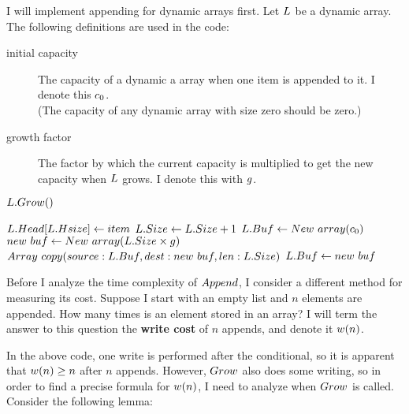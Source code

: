 \HdrDynArrayImpl

I will implement appending for dynamic arrays first. Let $L$ be a dynamic array. The following definitions are used in the code:

\begin{description}
	\item[initial capacity] The capacity of a dynamic a array when one item is appended to it. I denote this $c_0$.\\
	(The capacity of any dynamic array with size zero should be zero.)
	\item[growth factor] The factor by which the current capacity is multiplied to get the new capacity when $L$ grows. I denote this with $g$.
\end{description}

\begin{algorithm}
	\begin{algorithmic}[1]
				\State $L.Grow()$
			\EndIf
			
			\State $L.Head[L.Hsize] \gets item$
			\State $L.Size \gets L.Size + 1$
		\EndProcedure
		\Statex
				\State $L.Buf \gets New\ array(c_0)$
			\Else
				\State $new\ buf \gets \FuncNewArray(\VarList.\FieldSize \times \VarGrowthFactor)$
				\State $Array\ copy(source: L.Buf, dest: new\ buf, len: L.Size)$
				\State $L.Buf \gets new\ buf$
			\EndIf
		\EndProcedure
	\end{algorithmic}
\end{algorithm}

\HdrTimeComplex

Before I analyze the time complexity of $Append$, I consider a different method for measuring its cost. Suppose I start with an empty list and $n$ elements are appended. How many times is an element stored in an array? I will term the answer to this question the \textbf{write cost} of $n$ appends, and denote it $w(n)$.

In the above code, one write is performed after the conditional, so it is apparent that $w(n) \geq n$ after $n$ appends. However, $Grow$ also does some writing, so in order to find a precise formula for $w(n)$, I need to analyze when $Grow$ is called. Consider the following lemma:

